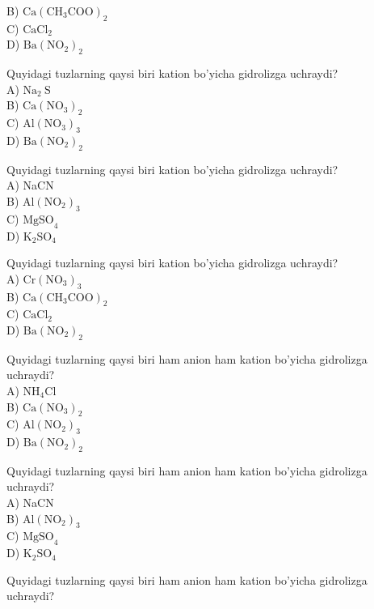 B) $\mathrm{Ca}\left(\mathrm{CH}_{3} \mathrm{COO}\right)_{2}$\\
C) $\mathrm{CaCl}_{2}$\\
D) $\mathrm{Ba}\left(\mathrm{NO}_{2}\right)_{2}$
  \item Quyidagi tuzlarning qaysi biri kation bo'yicha gidrolizga uchraydi?\\
A) $\mathrm{Na}_{2} \mathrm{~S}$\\
B) $\mathrm{Ca}\left(\mathrm{NO}_{3}\right)_{2}$\\
C) $\mathrm{Al}\left(\mathrm{NO}_{3}\right)_{3}$\\
D) $\mathrm{Ba}\left(\mathrm{NO}_{2}\right)_{2}$
  \item Quyidagi tuzlarning qaysi biri kation bo'yicha gidrolizga uchraydi?\\
A) NaCN\\
B) $\mathrm{Al}\left(\mathrm{NO}_{2}\right)_{3}$\\
C) $\mathrm{MgSO}_{4}$\\
D) $\mathrm{K}_{2} \mathrm{SO}_{4}$
  \item Quyidagi tuzlarning qaysi biri kation bo'yicha gidrolizga uchraydi?\\
A) $\mathrm{Cr}\left(\mathrm{NO}_{3}\right)_{3}$\\
B) $\mathrm{Ca}\left(\mathrm{CH}_{3} \mathrm{COO}\right)_{2}$\\
C) $\mathrm{CaCl}_{2}$\\
D) $\mathrm{Ba}\left(\mathrm{NO}_{2}\right)_{2}$
  \item Quyidagi tuzlarning qaysi biri ham anion ham kation bo'yicha gidrolizga uchraydi?\\
A) $\mathrm{NH}_{4} \mathrm{Cl}$\\
B) $\mathrm{Ca}\left(\mathrm{NO}_{3}\right)_{2}$\\
C) $\mathrm{Al}\left(\mathrm{NO}_{2}\right)_{3}$\\
D) $\mathrm{Ba}\left(\mathrm{NO}_{2}\right)_{2}$
  \item Quyidagi tuzlarning qaysi biri ham anion ham kation bo'yicha gidrolizga uchraydi?\\
A) NaCN\\
B) $\mathrm{Al}\left(\mathrm{NO}_{2}\right)_{3}$\\
C) $\mathrm{MgSO}_{4}$\\
D) $\mathrm{K}_{2} \mathrm{SO}_{4}$
  \item Quyidagi tuzlarning qaysi biri ham anion ham kation bo'yicha gidrolizga uchraydi?\\
